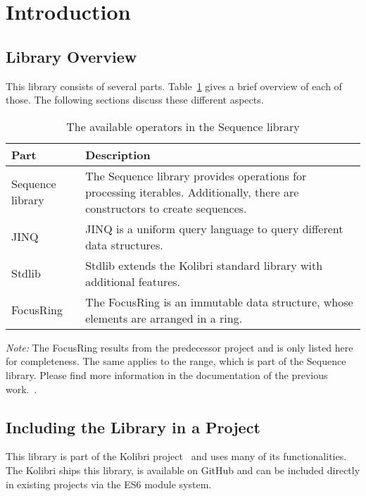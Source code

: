 \section{Introduction} %
\label{sec:Introduction}

\subsection{Library Overview} %
\label{sub:Sequence Library Overview}
This library consists of several parts. Table~\ref{tab:library_overview} gives a brief
overview of each of those. The following sections discuss these different
aspects.

\begin{table}[H]
  \centering
  \begin{tabularx}{\textwidth}{| l | X |} \hline
    \textbf{Part} & \textbf{Description} \\ \hline
    Sequence library & The Sequence library provides operations for processing iterables. Additionally, there are constructors to create sequences.\\ \hline 
    JINQ & JINQ is a uniform query language to query different data structures. \\ \hline 
    Stdlib & Stdlib extends the Kolibri standard library with additional features. \\ \hline 
    FocusRing & The FocusRing is an immutable data structure, whose elements
    are arranged in a ring. \\ \hline 
  \end{tabularx}
  \caption{The available operators in the Sequence library}
  \label{tab:library_overview}
\end{table}

\textit{Note:} The FocusRing results from the predecessor project and is only
listed here for completeness. The same applies to the range, which is part of
the Sequence library. Please find more information in the documentation of
the previous work.~\cite{wild_ip5_2023}. 

\subsection{Including the Library in a Project} %
\label{sub:Including the Library in a Project}
This library is part of the Kolibri project~\cite{kolibri} and uses many of its
functionalities. The Kolibri ships this library, is available on GitHub and can
be included directly in existing projects via the ES6 module system.
